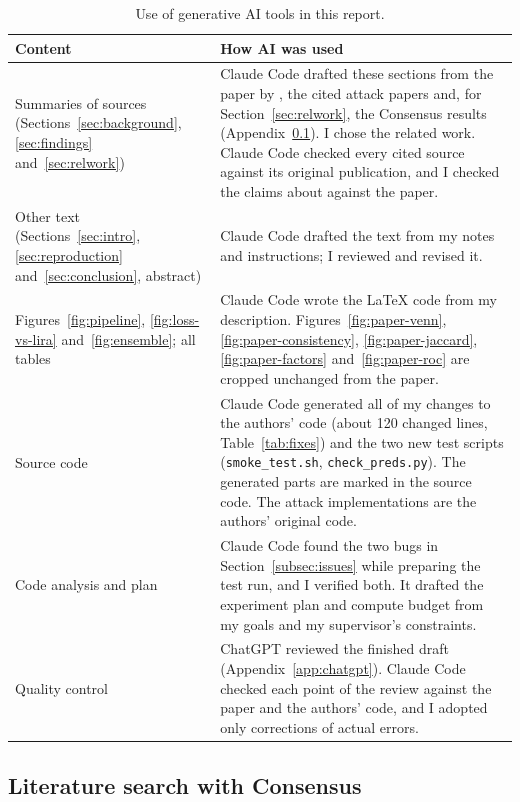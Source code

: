 \documentclass[a4paper]{article}
\begin{document}
\begin{table}[!htb]
  \centering
  \small
  \renewcommand{\arraystretch}{1.25}
  \begin{tabularx}{\textwidth}{@{}p{3.3cm} X@{}}
    \toprule
    Content & How AI was used \\
    \midrule
    Summaries of sources (Sections~\ref{sec:background}, \ref{sec:findings} and~\ref{sec:relwork}) &
      Claude Code drafted these sections from the paper by \citet{wang2025mia}, the cited attack papers and, for Section~\ref{sec:relwork}, the Consensus results (Appendix~\ref{app:consensus}). I chose the related work. Claude Code checked every cited source against its original publication, and I checked the claims about \citet{wang2025mia} against the paper. \\
    Other text (Sections~\ref{sec:intro}, \ref{sec:reproduction} and~\ref{sec:conclusion}, abstract) &
      Claude Code drafted the text from my notes and instructions; I reviewed and revised it. \\
    Figures~\ref{fig:pipeline}, \ref{fig:loss-vs-lira} and~\ref{fig:ensemble}; all tables &
      Claude Code wrote the \LaTeX{} code from my description. Figures~\ref{fig:paper-venn}, \ref{fig:paper-consistency}, \ref{fig:paper-jaccard}, \ref{fig:paper-factors} and~\ref{fig:paper-roc} are cropped unchanged from the paper. \\
    Source code &
      Claude Code generated all of my changes to the authors' code (about 120 changed lines, Table~\ref{tab:fixes}) and the two new test scripts (\texttt{smoke\_test.sh}, \texttt{check\_preds.py}). The generated parts are marked in the source code. The attack implementations are the authors' original code. \\
    Code analysis and plan &
      Claude Code found the two bugs in Section~\ref{subsec:issues} while preparing the test run, and I verified both. It drafted the experiment plan and compute budget from my goals and my supervisor's constraints. \\
    Quality control &
      ChatGPT reviewed the finished draft (Appendix~\ref{app:chatgpt}). Claude Code checked each point of the review against the paper and the authors' code, and I adopted only corrections of actual errors. \\
    \bottomrule
  \end{tabularx}
  \caption{Use of generative AI tools in this report.}
  \label{tab:ai-use}
\end{table}

\subsection{Literature search with Consensus}
\label{app:consensus}
\end{document}
